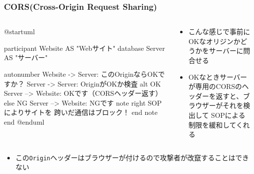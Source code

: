 \begin{frame}[fragile]
  \frametitle{CORS(Cross-Origin Request Sharing)}

  \pause
  \begin{columns}
    \begin{column}{.55\textwidth}
      \begin{minipage}{\textwidth}
        \begin{plantuml}
          @startuml
          
          participant Website AS "Webサイト"
          database Server AS "サーバー"
       
          autonumber
          Website -> Server: このOriginならOKですか？
          Server -> Server: OriginがOKか検査
          alt OK
            Server --> Website: OKです（CORSヘッダー返す）
          else NG
            Server --> Website: NGです
            note right
              SOPによりサイトを
              跨いだ通信はブロック！
            end note
          end
          @enduml
        \end{plantuml}
      \end{minipage}
    \end{column}
    \begin{column}{.45\textwidth}        
      \begin{itemize}
        \item {}こんな感じで事前にOKなオリジンかどうかをサーバーに問合せる

        \item OKなときサーバーが専用のCORSのヘッダーを返すと、ブラウザーがそれを検出して
        SOPによる制限を緩和してくれる
      \end{itemize}
    \end{column}
  \end{columns}

  \begin{itemize}
    \item この\lstinline|Origin|ヘッダーはブラウザーが付けるので攻撃者が改竄することはできない
  \end{itemize}
\end{frame}

